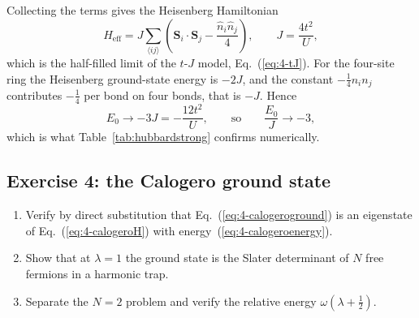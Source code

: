 Collecting the terms gives the Heisenberg Hamiltonian
\begin{equation}
  \hat{H}_{\mathrm{eff}}
   = J\sum_{\langle ij\rangle}\left(\bm{S}_i\cdot\bm{S}_j
     - \frac{\hat{n}_i\hat{n}_j}{4}\right),
  \qquad J = \frac{4t^2}{U},
  \label{eq:4-exh2}
\end{equation}
which is the half-filled limit of the $t$-$J$ model, Eq.~(\ref{eq:4-tJ}).
For the four-site ring the Heisenberg ground-state energy is $-2J$, and the
constant $-\tfrac14 n_i n_j$ contributes $-\tfrac14$ per bond on four bonds,
that is $-J$.  Hence
\begin{equation}
  E_0 \longrightarrow -3J = -\frac{12t^2}{U},
  \qquad\text{so}\qquad \frac{E_0}{J}\longrightarrow-3,
  \label{eq:4-exh3}
\end{equation}
which is what Table~\ref{tab:hubbardstrong} confirms numerically.

\subsection*{Exercise 4: the Calogero ground state}
\label{ex:4-calogero}

\begin{enumerate}
  \item[a)] Verify by direct substitution that
  Eq.~(\ref{eq:4-calogeroground}) is an eigenstate of
  Eq.~(\ref{eq:4-calogeroH}) with energy~(\ref{eq:4-calogeroenergy}).
  \item[b)] Show that at $\lambda=1$ the ground state is the Slater
  determinant of $N$ free fermions in a harmonic trap.
  \item[c)] Separate the $N=2$ problem and verify the relative energy
  $\omega(\lambda+\tfrac12)$.
\end{enumerate}


